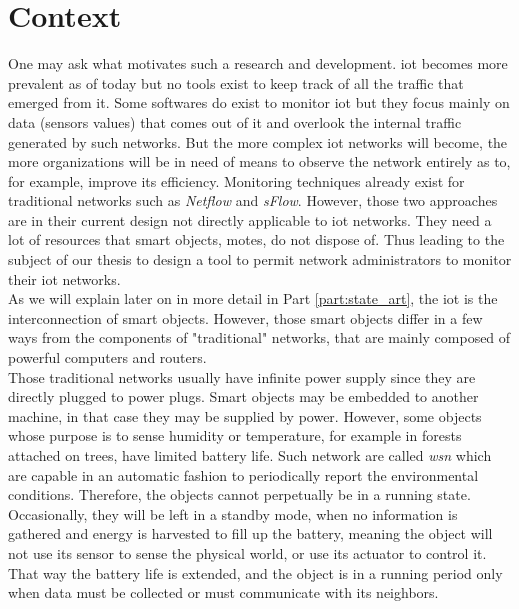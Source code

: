 \section*{Context}

One may ask what motivates such a research and development. \acrshort{iot} becomes more prevalent as of today but no tools exist to keep track of all the traffic that emerged from it. Some softwares do exist to monitor \acrshort{iot} but they focus mainly on data (sensors values) that comes out of it and overlook the internal traffic generated by such networks. But the more complex \acrshort{iot} networks will become, the more organizations will be in need of means to observe the network entirely as to, for example, improve its efficiency. Monitoring techniques already exist for traditional networks such as \textit{Netflow} and \textit{sFlow}. However, those two approaches are in their current design not directly applicable to \acrshort{iot} networks. They need a lot of resources that smart objects, motes, do not dispose of. Thus leading to the subject of our thesis to design a tool to permit network administrators to monitor their \acrshort{iot} networks.\\

As we will explain later on in more detail in Part \ref{part:state_art}, the \acrlong{iot} is the interconnection of smart objects. However, those smart objects differ in a few ways from the components of "traditional" networks, that are mainly composed of powerful computers and routers.\\

Those traditional networks usually have infinite power supply since they are directly plugged to power plugs. Smart objects may be embedded to another machine, in that case they may be supplied by power. However, some objects whose purpose is to sense humidity or temperature, for example in forests attached on trees, have limited battery life.  Such network are called \textit{\acrfull{wsn}} which are capable in an automatic fashion to periodically report the environmental conditions. Therefore, the objects cannot perpetually be in a running state. Occasionally, they will be left in a standby mode, when no information is gathered and energy is harvested to fill up the battery, meaning the object will not use its sensor to sense the physical world, or use its actuator to control it. That way the battery life is extended, and the object is in a running period only when data must be collected or must communicate with its neighbors. \\

